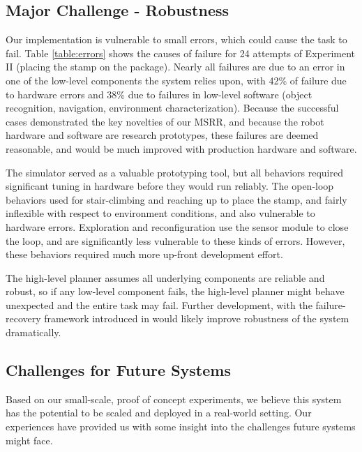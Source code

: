 \documentclass[12pt]{article}
\newcommand{\TODO}[1]{ {\bf \textcolor{red}{TODO:} #1 }}
\begin{document}
\subsection{Major Challenge - Robustness}
%
%
Our implementation is vulnerable to small errors, which could cause the task to fail. 
Table \ref{table:errors} shows the causes of failure for 24 attempts of Experiment II (placing the stamp on the package).  
Nearly all failures are due to an error in one of the low-level components the system relies upon, with
42\% of failure due to hardware errors and 38\% due to failures in low-level software (object recognition, navigation, environment characterization). Because the successful cases demonstrated the key novelties of our MSRR, and because the robot hardware and software are research prototypes, these failures are deemed reasonable, and would be much improved with production hardware and software. 

The simulator served as a valuable prototyping tool, but all behaviors required significant
tuning in hardware before they would run reliably.  
The open-loop behaviors used for stair-climbing and reaching up to place the stamp, and fairly
inflexible with respect to environment conditions, and also vulnerable to hardware
errors. %
Exploration and reconfiguration use the sensor module to close the
loop, and are significantly less vulnerable to these kinds of errors.  
However, these behaviors required much more up-front development effort.

The high-level planner assumes all underlying components are reliable and robust, so if any low-level component fails, the high-level planner might behave unexpected and the entire task may fail. Further development, with the failure-recovery framework introduced in \cite{Maniatopoulos16icra} would likely improve robustness of the system dramatically.

%
\subsection{Challenges for Future Systems}
%
Based on our small-scale, proof of concept experiments, we believe this system has the potential to be scaled and deployed in a real-world setting. Our experiences have provided us with some insight into the challenges future systems might face.
\end{document}
